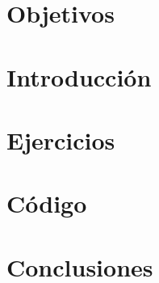 \documentclass[12pt]{article}
\begin{document}


\section{Objetivos}



\section{Introducción}



\section{Ejercicios}







\section{Código}







\section{Conclusiones}


\end{document}
